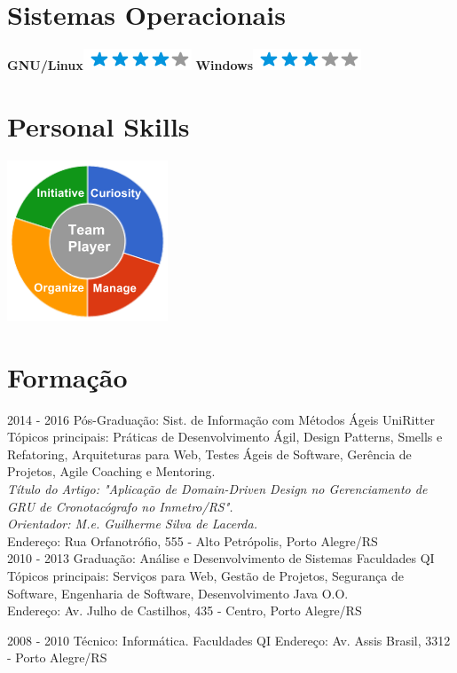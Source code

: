 \documentclass[]{friggeri-cv}
\begin{document}
\begin{aside}
  \section{Sistemas Operacionais}
    \textbf{GNU/Linux}\includegraphics[scale=0.40]{img/4stars.png}
    \textbf{Windows}\includegraphics[scale=0.40]{img/3stars.png}
    ~
  \section{Personal Skills}
    \includegraphics[scale=0.62]{img/personal.png}
    ~
\end{aside}

\section{Formação}
\begin{entrylist}
  \entry
    {2014 - 2016}
    {Pós-Graduação: Sist. de Informação com Métodos Ágeis}
    {UniRitter}
    {Tópicos principais: Práticas de Desenvolvimento Ágil, Design Patterns, Smells e Refatoring, Arquiteturas para Web, Testes Ágeis de Software, Gerência de Projetos, Agile Coaching e Mentoring.\\
    \emph{Título do Artigo: "Aplicação de Domain-Driven Design no Gerenciamento de
GRU de Cronotacógrafo no Inmetro/RS".}\\
    \emph{Orientador: M.e. Guilherme Silva de Lacerda.}\\
    Endereço: Rua Orfanotrófio, 555 - Alto Petrópolis, Porto Alegre/RS\\}
  \entry
    {2010 - 2013}
    {Graduação: Análise e Desenvolvimento de Sistemas}
    {Faculdades QI}
    {Tópicos principais: Serviços para Web, Gestão de Projetos, Segurança de Software, Engenharia de Software, Desenvolvimento Java O.O.\\
    Endereço: Av. Julho de Castilhos, 435 - Centro, Porto Alegre/RS\\}
    
  \entry
    {2008 - 2010}
    {Técnico: Informática.}
    {Faculdades QI}
    {Endereço: Av. Assis Brasil, 3312 - Porto Alegre/RS}
\end{entrylist}
\end{document}
